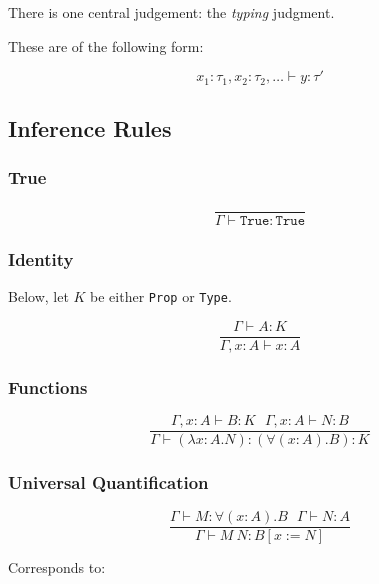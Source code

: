 \documentclass[10pt]{article}
\begin{document}
There is one central judgement: the \textit{typing} judgment.

These are of the following form:

\begin{equation*}
    x_1 : \tau_1, x_2 : \tau_2, \ldots \vdash y : \tau'
\end{equation*}

\subsection{Inference Rules}

\subsubsection{True}

\begin{equation*}
    \frac{}{\Gamma \vdash \mathtt{True} : \mathtt{True}}
\end{equation*}

\subsubsection{Identity}

Below, let $K$ be either \texttt{Prop} or \texttt{Type}.

\begin{equation*}
    \frac{\Gamma \vdash A : K}{\Gamma, x : A \vdash x : A}
\end{equation*}

\subsubsection{Functions}

\begin{equation*}
    \frac{\Gamma, x:A \vdash B : K~~~\Gamma, x : A \vdash N : B}{\Gamma \vdash (\lambda x : A.N) : (\forall (x : A).B) : K}
\end{equation*}

\subsubsection{Universal Quantification}

\begin{equation*}
    \frac{\Gamma \vdash M : \forall (x : A). B~~~\Gamma \vdash N : A}{\Gamma \vdash M~N : B[x := N]}
\end{equation*}

Corresponds to:
\end{document}
